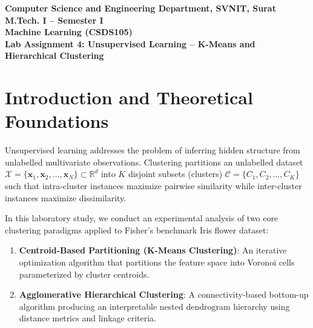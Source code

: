 \documentclass[12pt]{article}
\begin{document}

\begin{center}
\textbf{Computer Science and Engineering Department, SVNIT, Surat}\\
\textbf{M.Tech. I -- Semester I}\\
\textbf{Machine Learning (CSDS105)}\\
\textbf{Lab Assignment 4: Unsupervised Learning -- K-Means and Hierarchical Clustering}
\end{center}

\vspace{0.3cm}

\section{Introduction and Theoretical Foundations}

Unsupervised learning addresses the problem of inferring hidden structure from unlabelled multivariate observations. Clustering partitions an unlabelled dataset $\mathcal{X} = \{\mathbf{x}_1, \mathbf{x}_2, \dots, \mathbf{x}_N\} \subset \mathbb{R}^d$ into $K$ disjoint subsets (clusters) $\mathcal{C} = \{C_1, C_2, \dots, C_K\}$ such that intra-cluster instances maximize pairwise similarity while inter-cluster instances maximize dissimilarity.

In this laboratory study, we conduct an experimental analysis of two core clustering paradigms applied to Fisher's benchmark Iris flower dataset:
\begin{enumerate}
    \item \textbf{Centroid-Based Partitioning (K-Means Clustering)}: An iterative optimization algorithm that partitions the feature space into Voronoi cells parameterized by cluster centroids.
    \item \textbf{Agglomerative Hierarchical Clustering}: A connectivity-based bottom-up algorithm producing an interpretable nested dendrogram hierarchy using distance metrics and linkage criteria.
\end{enumerate}
\end{document}
